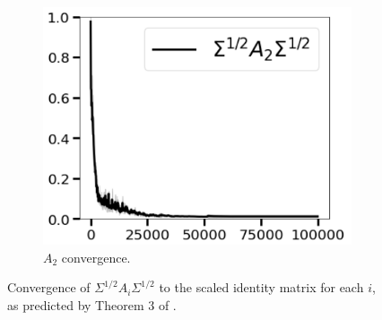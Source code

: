 \documentclass[11pt]{article}
\numberwithin{equation}{section}
\begin{document}
\begin{figure}[htbp]
\begin{subfigure}[b]{0.3\textwidth}
    \centering
    \includegraphics[width=\textwidth]{SigmaA2.png}
    \caption{\( A_2 \) convergence.}
    \label{fig:sigma_a2}
  \end{subfigure}
  \caption{Convergence of \( \Sigma^{1/2} A_i \Sigma^{1/2} \) to the scaled identity matrix for each \( i \), as predicted by Theorem 3 of \cite{ahn2024transformers}.}
  \label{fig:convergence_plots}
\end{figure}
\end{document}
